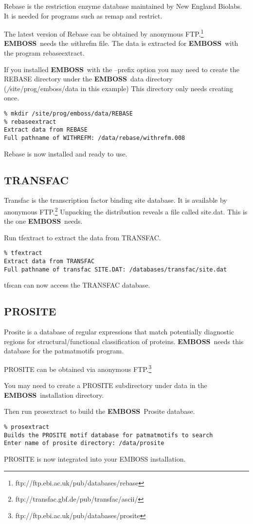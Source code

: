 \documentclass{report}
\newcommand{\filename}[1]{{\sf\textsl #1}}
\newcommand{\progname}[1]{{\sc #1}}
\newcommand{\EMBOSS}{{\sf\bfseries EMBOSS}}
\begin{document}
      Rebase is the restriction enzyme database maintained by New England Biolabs. It is needed for programs such as remap and restrict.

The latest version of Rebase can be obtained by anonymous FTP.\footnote{ftp://ftp.ebi.ac.uk/pub/databases/rebase} \EMBOSS\ needs the \filename{withrefm} file. The data is extracted for \EMBOSS\ with the program \progname{rebaseextract}.

If you installed \EMBOSS\ with the --prefix option you may need to create the REBASE directory under the \EMBOSS\ data directory (\filename{/site/prog/emboss/data} in this example) This directory only needs creating once.
\begin{verbatim}
% mkdir /site/prog/emboss/data/REBASE
% rebaseextract
Extract data from REBASE
Full pathname of WITHREFM: /data/rebase/withrefm.008
\end{verbatim}
Rebase is now installed and ready to use.

      \subsection{TRANSFAC}

Transfac is the transcription factor binding site database. It is available by anonymous FTP.\footnote{ftp://transfac.gbf.de/pub/transfac/ascii/} 
Unpacking the distribution reveals a file called site.dat. This is the one \EMBOSS\ needs.

Run \progname{tfextract} to extract the data from TRANSFAC.
\begin{verbatim}
% tfextract
Extract data from TRANSFAC
Full pathname of transfac SITE.DAT: /databases/transfac/site.dat
\end{verbatim}
\progname{tfscan} can now access the TRANSFAC database.

      \subsection{PROSITE}
Prosite is a database of regular expressions that match potentially diagnostic regions for structural/functional classification of proteins. \EMBOSS\ needs this database for the patmatmotifs program.

PROSITE can be obtained via anonymous FTP.\footnote{ftp://ftp.ebi.ac.uk/pub/databases/prosite} 

You may need to create a PROSITE subdirectory under data in the \EMBOSS\ installation directory. 

Then run \progname{prosextract} to build the \EMBOSS\ Prosite database.
\begin{verbatim}
% prosextract
Builds the PROSITE motif database for patmatmotifs to search
Enter name of prosite directory: /data/prosite
\end{verbatim}
PROSITE is now integrated into your EMBOSS installation.
\end{document}
